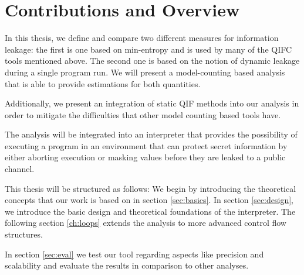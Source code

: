 \section{Contributions and Overview}
In this thesis, we define and compare two different measures for information leakage: the first is one based on min-entropy and is used by many of the QIFC tools mentioned above. The second one is based on the notion of dynamic leakage during a single program run. We will present a model-counting based analysis that is able to provide estimations for both quantities.

Additionally, we present an integration of static QIF methods into our analysis in order to mitigate the difficulties that other model counting based tools have.

The analysis will be integrated into an interpreter that provides the possibility of executing a program in an environment that can protect secret information by either aborting execution or masking values before they are leaked to a public channel.

This thesis will be structured as follows: We begin by introducing the theoretical concepts that our work is based on in section \ref{sec:basics}. In section \ref{sec:design}, we introduce the basic design and theoretical foundations of the interpreter. The following section \ref{ch:loops} extends the analysis to more advanced control flow structures.

In section \ref{sec:eval} we test our tool regarding aspects like precision and scalability and evaluate the results in comparison to other analyses.
